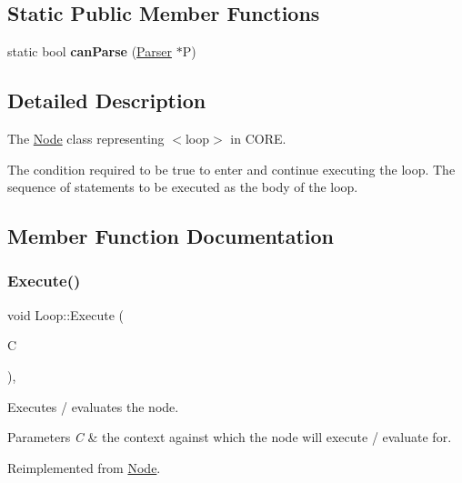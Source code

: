 \subsection*{Static Public Member Functions}
\begin{DoxyCompactItemize}
\item 
\mbox{\label{class_loop_af116709f5340c758920842ca6999b92f}} 
static bool {\bfseries can\+Parse} (\mbox{\hyperlink{class_parser}{Parser}} $\ast$P)
\end{DoxyCompactItemize}


\subsection{Detailed Description}
The \mbox{\hyperlink{class_node}{Node}} class representing {\ttfamily $<$loop$>$} in C\+O\+RE. 

The condition required to be true to enter and continue executing the loop. The sequence of statements to be executed as the body of the loop. 

\subsection{Member Function Documentation}
\mbox{\label{class_loop_aaf0a44c940844b8ac4ac521dbb703f9a}} 
\subsubsection{\texorpdfstring{Execute()}{Execute()}}
{\footnotesize\ttfamily void Loop\+::\+Execute (\begin{DoxyParamCaption}\item[{\mbox{\hyperlink{class_a_s_t_context}{A\+S\+T\+Context}} \&}]{C }\end{DoxyParamCaption})\hspace{0.3cm}{\ttfamily [override]}, {\ttfamily [virtual]}}

Executes / evaluates the node. 
\begin{DoxyParams}{Parameters}
{\em C} & the context against which the node will execute / evaluate for. \\
\hline
\end{DoxyParams}


Reimplemented from \mbox{\hyperlink{class_node_a27ad1ba81d2596817b361368282bcbfa}{Node}}.

